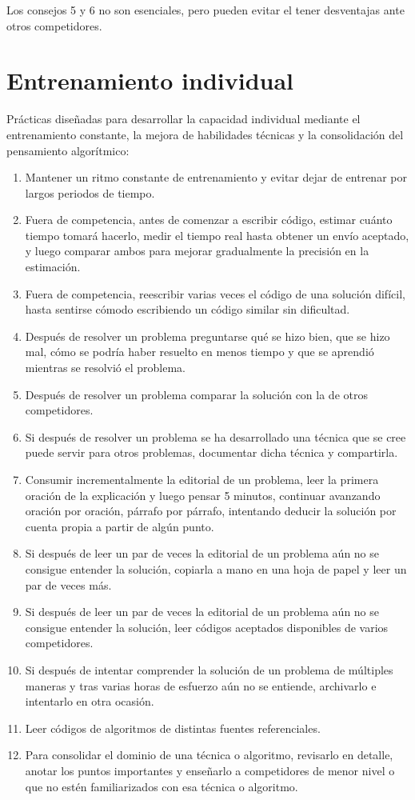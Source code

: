 Los consejos 5 y 6 no son esenciales, pero pueden evitar el tener desventajas ante otros competidores.
\pagebreak
\section{Entrenamiento individual}
Prácticas diseñadas para desarrollar la capacidad individual mediante el entrenamiento constante, la mejora de habilidades técnicas y la consolidación del pensamiento algorítmico:
\begin{enumerate}[resume=icpc]
    \item Mantener un ritmo constante de entrenamiento y evitar dejar de entrenar por largos periodos de tiempo.
    \item Fuera de competencia, antes de comenzar a escribir código, estimar cuánto tiempo tomará hacerlo, medir el tiempo real hasta obtener un envío aceptado, y luego comparar ambos para mejorar gradualmente la precisión en la estimación.
    \item Fuera de competencia, reescribir varias veces el código de una solución difícil, hasta sentirse cómodo escribiendo un código similar sin dificultad.
    \item Después de resolver un problema preguntarse qué se hizo bien, que se hizo mal, cómo se podría haber resuelto en menos tiempo y que se aprendió mientras se resolvió el problema.
    \item Después de resolver un problema comparar la solución con la de otros competidores.
    \item Si después de resolver un problema se ha desarrollado una técnica que se cree puede servir para otros problemas, documentar dicha técnica y compartirla.
    \item Consumir incrementalmente la editorial de un problema, leer la primera oración de la explicación y luego pensar 5 minutos, continuar avanzando oración por oración, párrafo por párrafo, intentando deducir la solución por cuenta propia a partir de algún punto.
    \item Si después de leer un par de veces la editorial de un problema aún no se consigue entender la solución, copiarla a mano en una hoja de papel y leer un par de veces más.
    \item Si después de leer un par de veces la editorial de un problema aún no se consigue entender la solución, leer códigos aceptados disponibles de varios competidores.
    \item Si después de intentar comprender la solución de un problema de múltiples maneras y tras varias horas de esfuerzo aún no se entiende, archivarlo e intentarlo en otra ocasión.
    \item Leer códigos de algoritmos de distintas fuentes referenciales.
    \item Para consolidar el dominio de una técnica o algoritmo, revisarlo en detalle, anotar los puntos importantes y enseñarlo a competidores de menor nivel o que no estén familiarizados con esa técnica o algoritmo.
\end{enumerate}
